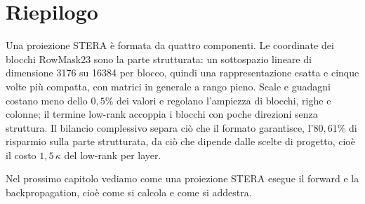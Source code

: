 \section{Riepilogo}

Una proiezione STERA è formata da quattro componenti. Le coordinate dei blocchi RowMask23 sono la parte strutturata: un sottospazio lineare di dimensione \num{3176} su \num{16384} per blocco, quindi una rappresentazione esatta e cinque volte più compatta, con matrici in generale a rango pieno. Scale e guadagni costano meno dello $0{,}5\%$ dei valori e regolano l'ampiezza di blocchi, righe e colonne; il termine low-rank accoppia i blocchi con poche direzioni senza struttura. Il bilancio complessivo separa ciò che il formato garantisce, l'$80{,}61\%$ di risparmio sulla parte strutturata, da ciò che dipende dalle scelte di progetto, cioè il costo $1{,}5\,\kappa$ del low-rank per layer.

Nel prossimo capitolo vediamo come una proiezione STERA esegue il forward e la backpropagation, cioè come si calcola e come si addestra.
